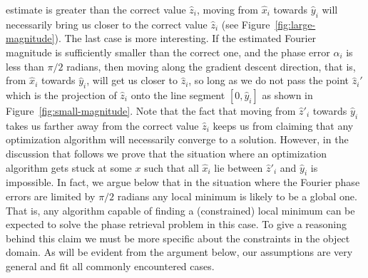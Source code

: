 estimate is greater than the correct value $\hat{z}_{i}$, moving from
$\hat{x}_{i}$ towards $\hat{y}_{i}$ will necessarily bring us closer
to the correct value $\hat{z}_{i}$ (see
Figure~\ref{fig:large-magnitude}). The last case is more
interesting. If the estimated Fourier magnitude is sufficiently
smaller than the correct one, and the phase error $\alpha_{i}$ is less
than $\pi/2$ radians, then moving along the gradient descent
direction, that is, from $\hat{x}_{i}$ towards $\hat{y}_{i}$, will get us
closer to $\hat{z}_{i}$, so long as we do not pass the point
$\hat{z}_{i}'$ which is the projection of $\hat{z}_{i}$ onto the line
segment $[0, \hat{y}_{i}]$ as shown in
Figure~\ref{fig:small-magnitude}.  Note that the fact that moving from
$\hat{z}'_{i}$ towards $\hat{y}_{i}$ takes us farther away from the
correct value $\hat{z}_{i}$ keeps us from claiming that any
optimization algorithm will necessarily converge to a
solution. However, in the discussion that follows we prove that the
situation where an optimization algorithm gets stuck at some $x$ such
that all $\hat{x}_{i}$ lie between $\hat{z}'_{i}$ and $\hat{y}_{i}$ is
impossible. In fact, we argue below that in the situation where the Fourier
phase errors are limited by $\pi/2$ radians any local minimum is
likely to be a global one. That is, any algorithm capable of finding a
(constrained) local minimum can be expected to solve the phase
retrieval problem in this case. To give a reasoning behind this claim
we must be more specific about the constraints in the object
domain. As will be evident from the argument below, our assumptions
are very general and fit all commonly encountered cases.

